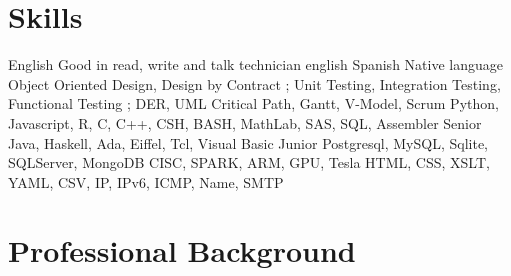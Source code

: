 \section{Skills}
        {English}
        {Good in read, write and talk technician english}
        {}
        {}
        {}
\cventry{}
        {Spanish}
        {Native language}
        {}
        {}
        {}
        {Object Oriented Design, Design by Contract ; Unit Testing, Integration Testing, Functional Testing ; DER, UML}
        {}
        {}
        {}
        {}
        {Critical Path, Gantt, V-Model, Scrum}
        {}
        {}
        {}
        {}
        {Python, Javascript, R, C, C++, CSH, BASH, MathLab, SAS, SQL, Assembler}
        {Senior}
        {}
        {}
        {}
\cventry{}
        {Java, Haskell, Ada, Eiffel, Tcl, Visual Basic}
        {Junior}
        {}
        {}
        {}
        {Postgresql, MySQL, Sqlite, SQLServer, MongoDB}
        {}
        {}
        {}
        {}
        {CISC, SPARK, ARM, GPU, Tesla}
        {}
        {}
        {}
        {}
        {HTML, CSS, XSLT, YAML, CSV, IP, IPv6, ICMP, Name, SMTP}
        {}
        {}
        {}
        {}

	\pagebreak[4]

\section{Professional Background}\label{profesional:desde}

